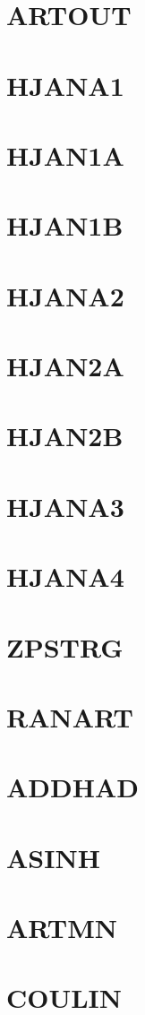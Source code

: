 \documentclass[14pt,UTF8]{ctexbook}
\begin{document}
\section{ARTOUT}
\section{HJANA1}
\section{HJAN1A}
\section{HJAN1B}
\section{HJANA2}
\section{HJAN2A}
\section{HJAN2B}
\section{HJANA3}
\section{HJANA4}
\section{ZPSTRG}
\section{RANART}
\section{ADDHAD}
\section{ASINH}
\section{ARTMN}
\section{COULIN}
\end{document}
